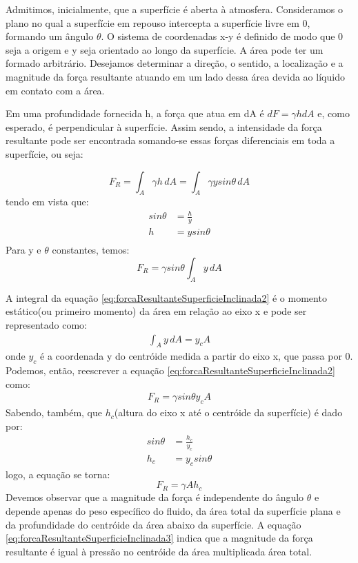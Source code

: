 \documentclass{article}
\begin{document}
Admitimos, inicialmente, que a superfície é aberta à atmosfera. Consideramos o plano no qual a superfície em repouso intercepta a superfície livre em 0, formando um ângulo $\theta$. O sistema de coordenadas x-y é definido de modo que 0 seja a origem e y seja orientado ao longo da superfície. A área pode ter um formado arbitrário. Desejamos determinar a direção, o sentido, a localização e a magnitude da força resultante atuando em um lado dessa área devida ao líquido em contato com a área.

Em uma profundidade fornecida h, a força que atua em dA é $dF = \gamma h dA$ e, como esperado, é perpendicular à superfície. Assim sendo, a intensidade da força resultante pode ser encontrada somando-se essas forças diferenciais em toda a superfície, ou seja:

\begin{equation}
  F_R = \int_{A}^{ } \gamma h\, dA = \int_{A}^{ } \gamma y sin\theta\, dA
  \label{eq:integrandoForcaSuperficieInclinada}
\end{equation}
tendo em vista que:
\begin{align}
  sin\theta &= \frac{h}{y}\\
  h &= y sin\theta \\
  \label{eq:formulaProfundidadeAreaSuperficieInclinada}
\end{align}
Para y e $\theta$ constantes, temos:
\begin{equation}
  F_R=\gamma sin \theta \int_{A}^{ } y\, dA
  \label{eq:forcaResultanteSuperficieInclinada2}
\end{equation}

A integral da equação \ref{eq:forcaResultanteSuperficieInclinada2} é o momento estático(ou primeiro momento) da área em relação ao eixo x e pode ser representado como:
\begin{align}
  \int_{A}^{ } y\, dA = y_cA
\end{align}
onde $y_c$ é a coordenada y do centróide medida a partir do eixo x, que passa por 0.
Podemos, então, reescrever a equação \ref{eq:forcaResultanteSuperficieInclinada2} como:
\begin{align*}
   F_R=\gamma sin\theta y_c A
\end{align*}
Sabendo, também, que $h_c$(altura do eixo x até o centróide da superfície) é dado por:
\begin{align*}
  sin\theta &=\frac{h_c}{y_c} \\
  h_c&=y_c sin\theta 
\end{align*}
logo, a equação se torna:
\begin{equation}
  F_R=\gamma A h_c
  \label{eq:forcaResultanteSuperficieInclinada3}
\end{equation}
Devemos observar que a magnitude da força é independente do ângulo $\theta$ e depende apenas do peso específico do fluido, da área total da superfície plana e da profundidade do centróide da área abaixo da superfície. A equação \ref{eq:forcaResultanteSuperficieInclinada3} indica que a magnitude da força resultante é igual à pressão no centróide da área multiplicada área total.
\end{document}
